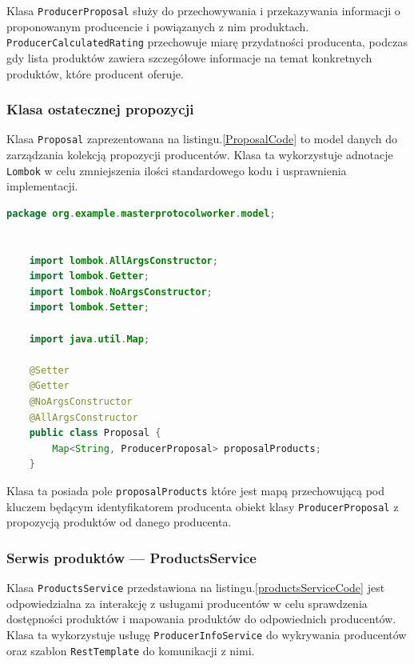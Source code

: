 Klasa \verb|ProducerProposal| służy do przechowywania i przekazywania informacji o proponowanym producencie i powiązanych z nim produktach. \verb|ProducerCalculatedRating| przechowuje miarę przydatności producenta, podczas gdy lista produktów zawiera szczegółowe informacje na temat konkretnych produktów, które producent oferuje.

\subsubsection{Klasa ostatecznej propozycji}

Klasa \verb|Proposal| zaprezentowana na listingu.\ref{ProposalCode} to model danych do zarządzania kolekcją propozycji producentów. Klasa ta wykorzystuje adnotacje \verb|Lombok| w celu zmniejszenia ilości standardowego kodu i usprawnienia implementacji.

\begin{lstlisting}[language=Java, caption=Kod klasy Proposal,label=ProposalCode]
    package org.example.masterprotocolworker.model;
    
    
    import lombok.AllArgsConstructor;
    import lombok.Getter;
    import lombok.NoArgsConstructor;
    import lombok.Setter;
    
    import java.util.Map;
    
    @Setter
    @Getter
    @NoArgsConstructor
    @AllArgsConstructor
    public class Proposal {
        Map<String, ProducerProposal> proposalProducts;
    }
\end{lstlisting}

Klasa ta posiada pole \verb|proposalProducts| które jest mapą przechowującą pod kluczem będącym identyfikatorem producenta obiekt klasy \verb|ProducerProposal| z propozycją produktów od danego producenta.

\subsubsection{Serwis produktów --- ProductsService}

Klasa \verb|ProductsService| przedstawiona na listingu.\ref{productsServiceCode} jest odpowiedzialna za interakcję z usługami producentów w celu sprawdzenia dostępności produktów i mapowania produktów do odpowiednich producentów. Klasa ta wykorzystuje usługę \verb|ProducerInfoService| do wykrywania producentów oraz szablon \verb|RestTemplate| do komunikacji z nimi. 

